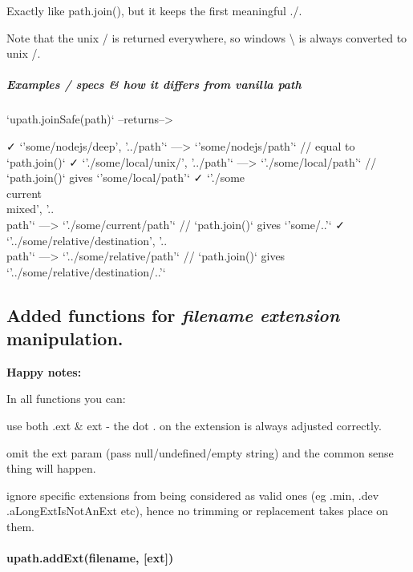 Exactly like {\ttfamily path.\+join()}, but it keeps the first meaningful {\ttfamily ./}.

Note that the unix {\ttfamily /} is returned everywhere, so windows {\ttfamily \textbackslash{}} is always converted to unix {\ttfamily /}.

\subparagraph*{Examples / specs \& how it differs from vanilla {\ttfamily path}}

\begin{DoxyVerb}`upath.joinSafe(path)`        --returns-->

    ✓ `'some/nodejs/deep', '../path'`                --->           `'some/nodejs/path'`  // equal to `path.join()`
    ✓ `'./some/local/unix/', '../path'`              --->          `'./some/local/path'`  // `path.join()` gives `'some/local/path'`
    ✓ `'./some\\current\\mixed', '..\\path'`         --->        `'./some/current/path'`  // `path.join()` gives `'some\current\mixed/..\path'`
    ✓ `'../some/relative/destination', '..\\path'`   --->      `'../some/relative/path'`  // `path.join()` gives `'../some/relative/destination/..\path'`
\end{DoxyVerb}


\subsection*{Added functions for {\itshape filename extension} manipulation.}

{\bfseries Happy notes\+:}

In all functions you can\+:


\begin{DoxyItemize}
\item use both {\ttfamily .ext} \& {\ttfamily ext} -\/ the dot {\ttfamily .} on the extension is always adjusted correctly.
\item omit the {\ttfamily ext} param (pass null/undefined/empty string) and the common sense thing will happen.
\item ignore specific extensions from being considered as valid ones (eg {\ttfamily .min}, {\ttfamily .dev} {\ttfamily .a\+Long\+Ext\+Is\+Not\+An\+Ext} etc), hence no trimming or replacement takes place on them.
\end{DoxyItemize}

\paragraph*{{\ttfamily upath.\+add\+Ext(filename, \mbox{[}ext\mbox{]})}}

